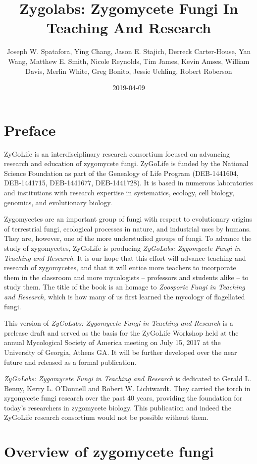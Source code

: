 \documentclass[]{book}
\title{Zygolabs: Zygomycete Fungi In Teaching And Research}
\author{Joseph W. Spatafora, Ying Chang, Jason E. Stajich, Derreck Carter-House,
Yan Wang, Matthew E. Smith, Nicole Reynolds, Tim James, Kevin Amses,
William Davis, Merlin White, Greg Bonito, Jessie Uehling, Robert
Roberson}
\date{2019-04-09}
\begin{document}
\maketitle

{
\setcounter{tocdepth}{1}
\tableofcontents
}
\chapter*{Preface}\label{preface}

ZyGoLife is an interdisciplinary research consortium focused on
advancing research and education of zygomycete fungi. ZyGoLife is funded
by the National Science Foundation as part of the Genealogy of Life
Program (DEB-1441604, DEB-1441715, DEB-1441677, DEB-1441728). It is
based in numerous laboratories and institutions with research expertise
in systematics, ecology, cell biology, genomics, and evolutionary
biology.

Zygomycetes are an important group of fungi with respect to evolutionary
origins of terrestrial fungi, ecological processes in nature, and
industrial uses by humans. They are, however, one of the more
understudied groups of fungi. To advance the study of zygomycetes,
ZyGoLife is producing \emph{ZyGoLabs: Zygomycete Fungi in Teaching and
Research}. It is our hope that this effort will advance teaching and
research of zygomycetes, and that it will entice more teachers to
incorporate them in the classroom and more mycologists -- professors and
students alike -- to study them. The title of the book is an homage to
\emph{Zoosporic Fungi in Teaching and Research}, which is how many of us
first learned the mycology of flagellated fungi.

This version of \emph{ZyGoLabs: Zygomycete Fungi in Teaching and
Research} is a prelease draft and served as the basis for the ZyGoLife
Workshop held at the annual Mycological Society of America meeting on
July 15, 2017 at the University of Georgia, Athens GA. It will be
further developed over the near future and released as a formal
publication.

\emph{ZyGoLabs: Zygomycete Fungi in Teaching and Research} is dedicated
to Gerald L. Benny, Kerry L. O'Donnell and Robert W. Lichtwardt. They
carried the torch in zygomycete fungi research over the past 40 years,
providing the foundation for today's researchers in zygomycete biology.
This publication and indeed the ZyGoLife research consortium would not
be possible without them.

\chapter{Overview of zygomycete fungi}\label{intro}
\end{document}
